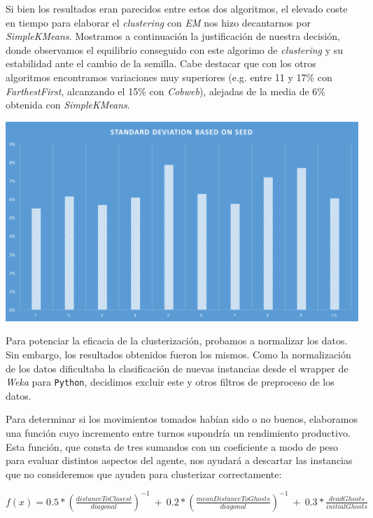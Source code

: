 \documentclass[12pt]{article}
\begin{document}
Si bien los resultados eran parecidos entre estos dos algoritmos, el elevado coste en tiempo para elaborar el \textit{clustering} con \textit{EM} nos hizo decantarnos por \textit{SimpleKMeans}. Mostramos a continuación la justificación de nuestra decisión, donde observamos el equilibrio conseguido con este algorimo de \textit{clustering} y su estabilidad ante el cambio de la semilla. Cabe destacar que con los otros algoritmos encontramos variaciones muy superiores (e.g. entre 11 y 17\% con \textit{FarthestFirst}, alcanzando el 15\% con \textit{Cobweb}), alejadas de la media de 6\% obtenida con \textit{SimpleKMeans}.

\begin{center}
    \includegraphics[width=15cm]{stdff}
\end{center}


Para potenciar la eficacia de la clusterización, probamos a normalizar los datos. Sin embargo, los resultados obtenidos fueron los mismos. Como la normalización de los datos dificultaba la clasificación de nuevas instancias desde el wrapper de \textit{Weka} para \texttt{Python}, decidimos excluir este y otros filtros de preproceso de los datos. 

Para determinar si los movimientos tomados habían sido o no buenos, elaboramos una función cuyo incremento entre turnos supondría un rendimiento productivo. Esta función, que consta de tres sumandos con un coeficiente a modo de peso para evaluar distintos aspectos del agente, nos ayudará a descartar las instancias que no consideremos que ayuden para clusterizar correctamente:

\begin{center}
    $ f(x) =  0.5*(\frac{distanceToClosest}{diagonal})^{-1}\ +\ 0.2*(\frac{meanDistanceToGhosts}{diagonal})^{-1}\ +\ 0.3*\frac{deadGhosts}{initialGhosts} $
\end{center}
\end{document}
